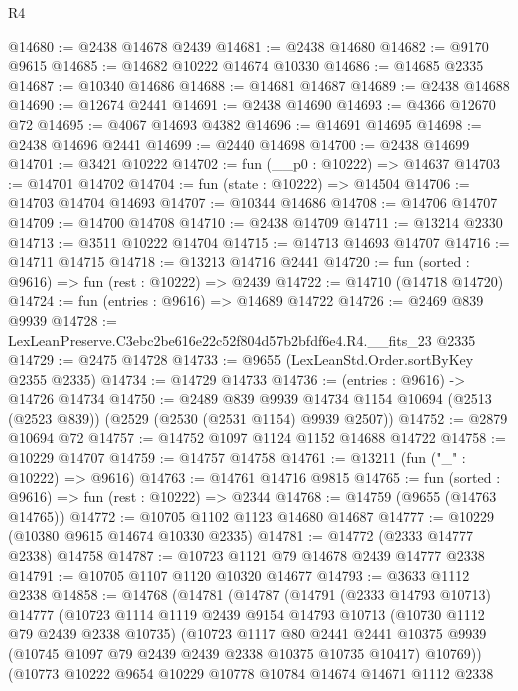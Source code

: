 \begin{lexlean}{R4}
\begin{coremodule}
@14680 := @2438 @14678 @2439
@14681 := @2438 @14680
@14682 := @9170 @9615
@14685 := @14682 @10222 @14674 @10330
@14686 := @14685 @2335
@14687 := @10340 @14686
@14688 := @14681 @14687
@14689 := @2438 @14688
@14690 := @12674 @2441
@14691 := @2438 @14690
@14693 := @4366 @12670 @72
@14695 := @4067 @14693 @4382
@14696 := @14691 @14695
@14698 := @2438 @14696 @2441
@14699 := @2440 @14698
@14700 := @2438 @14699
@14701 := @3421 @10222
@14702 := fun (__p0 : @10222) => @14637
@14703 := @14701 @14702
@14704 := fun (state : @10222) => @14504
@14706 := @14703 @14704 @14693
@14707 := @10344 @14686
@14708 := @14706 @14707
@14709 := @14700 @14708
@14710 := @2438 @14709
@14711 := @13214 @2330
@14713 := @3511 @10222 @14704
@14715 := @14713 @14693 @14707
@14716 := @14711 @14715
@14718 := @13213 @14716 @2441
@14720 := fun (sorted : @9616) => fun (rest : @10222) => @2439
@14722 := @14710 (@14718 @14720)
@14724 := fun (entries : @9616) => @14689 @14722
@14726 := @2469 @839 @9939
@14728 := LexLeanPreserve.C3ebc2be616e22c52f804d57b2bfdf6e4.R4.__fits_23 @2335
@14729 := @2475 @14728
@14733 := @9655 (LexLeanStd.Order.sortByKey @2355 @2335)
@14734 := @14729 @14733
@14736 := (entries : @9616) -> @14726 @14734
@14750 := @2489
    @839
    @9939
    @14734
    @1154
    @10694
    (@2513 (@2523 @839))
    (@2529 (@2530 (@2531 @1154) @9939 @2507))
@14752 := @2879 @10694 @72
@14757 := @14752 @1097 @1124 @1152 @14688 @14722
@14758 := @10229 @14707
@14759 := @14757 @14758
@14761 := @13211 (fun ("_" : @10222) => @9616)
@14763 := @14761 @14716 @9815
@14765 := fun (sorted : @9616) => fun (rest : @10222) => @2344
@14768 := @14759 (@9655 (@14763 @14765))
@14772 := @10705 @1102 @1123 @14680 @14687
@14777 := @10229 (@10380 @9615 @14674 @10330 @2335)
@14781 := @14772 (@2333 @14777 @2338) @14758
@14787 := @10723 @1121 @79 @14678 @2439 @14777 @2338
@14791 := @10705 @1107 @1120 @10320 @14677
@14793 := @3633 @1112 @2338
@14858 := @14768
    (@14781
      (@14787
        (@14791
          (@2333 @14793 @10713)
          @14777
          (@10723
            @1114
            @1119
            @2439
            @9154
            @14793
            @10713
            (@10730 @1112 @79 @2439 @2338 @10735)
            (@10723
              @1117
              @80
              @2441
              @2441
              @10375
              @9939
              (@10745 @1097 @79 @2439 @2439 @2338 @10375 @10735 @10417)
              @10769))
          (@10773
            @10222
            @9654
            @10229
            @10778
            @10784
            @14674
            @14671
            @1112
            @2338

\end{coremodule}
\end{lexlean}
